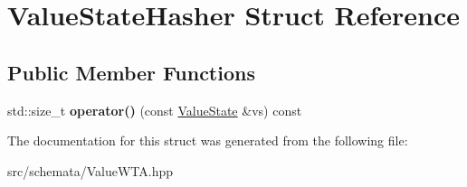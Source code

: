 \hypertarget{structValueStateHasher}{}\section{Value\+State\+Hasher Struct Reference}
\label{structValueStateHasher}
\subsection*{Public Member Functions}
\begin{DoxyCompactItemize}
\item 
\mbox{\label{structValueStateHasher_a1d8ffc1cdea4f157957f66041fcbf7f6}} 
std\+::size\+\_\+t {\bfseries operator()} (const \mbox{\hyperlink{classValueState}{Value\+State}} \&vs) const
\end{DoxyCompactItemize}


The documentation for this struct was generated from the following file\+:\begin{DoxyCompactItemize}
\item 
src/schemata/Value\+W\+T\+A.\+hpp\end{DoxyCompactItemize}
